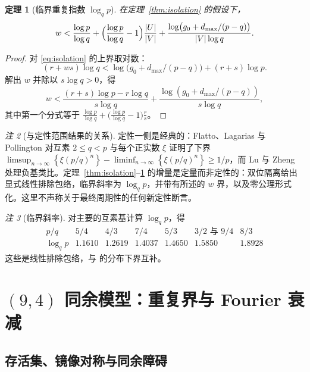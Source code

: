 \documentclass[11pt,a4paper]{article}
\newtheorem{theorem}{定理}[section]
\theoremstyle{remark}
\newtheorem{remark}[theorem]{注}
\newcommand{\fract}[1]{\left\{#1\right\}}
\begin{document}
\begin{theorem}[临界重复指数 $\log_{q} p$]
\label{thm:pqrep}
在定理~\ref{thm:isolation} 的假设下，
\[
  w < \frac{\log p}{\log q} + \Bigl(\frac{\log p}{\log q} - 1\Bigr)\frac{|U|}{|V|}
      + \frac{\log\bigl(g_{0} + d_{\max}/(p-q)\bigr)}{|V| \log q}.
\]
\end{theorem}

\begin{proof}
对 \eqref{eq:isolation} 的上界取对数：
\[
  (r + ws) \log q < \log\bigl(g_{0} + d_{\max}/(p-q)\bigr) + (r+s)\log p .
\]
解出 $w$ 并除以 $s \log q > 0$，得
\[
  w < \frac{(r+s)\log p - r \log q}{s \log q} + \frac{\log(g_{0} + d_{\max}/(p-q))}{s \log q},
\]
其中第一个分式等于 $\tfrac{\log p}{\log q} + \bigl(\tfrac{\log p}{\log q} - 1\bigr)\tfrac{r}{s}$。
\end{proof}

\begin{remark}[与定性范围结果的关系]
\label{rem:qualitative}
定性一侧是经典的：Flatto、Lagarias 与 Pollington \citep{flp1995} 对互素 $2 \le q < p$ 与每个正实数 $\xi$ 证明了下界 $\limsup_{n\to\infty}\fract{\xi(p/q)^{n}} - \liminf_{n\to\infty}\fract{\xi(p/q)^{n}} \ge 1/p$，而 Lu 与 Zheng \citep{luzheng2026} 处理负基类比。定理~\ref{thm:isolation}--\ref{thm:pqrep} 的增量是定量而非定性的：双位隔离给出显式线性排除包络，临界斜率为 $\log_{q} p$，并带有所述的 $w$ 界，以及零公理形式化。这里不声称关于最终周期性的任何新定性断言。
\end{remark}

\begin{remark}[临界斜率]
对主要的互素基计算 $\log_{q} p$，得
\[
  \begin{array}{c|cccccc}
    p/q & 5/4 & 4/3 & 7/4 & 5/3 & 3/2 \text{ 与 } 9/4 & 8/3 \\ \hline
    \log_{q} p & 1.1610 & 1.2619 & 1.4037 & 1.4650 & 1.5850 & 1.8928
  \end{array}
\]
这些是线性排除包络，与 \citep{flp1995,luzheng2026} 的分布下界互补。
\end{remark}

\section{\texorpdfstring{$(9,4)$}{(9,4)} 同余模型：重复界与 Fourier 衰减}
\label{sec:model94}

\subsection{存活集、镜像对称与同余障碍}
\end{document}

